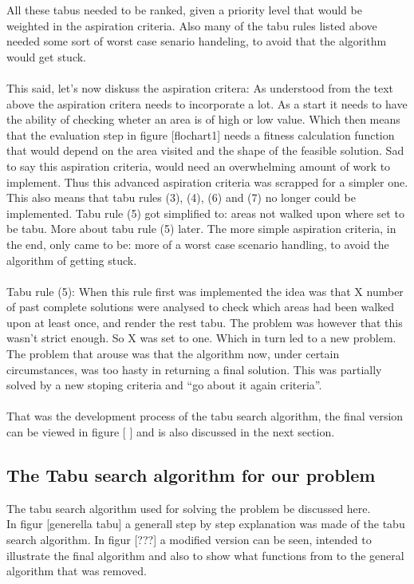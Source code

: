All these tabus needed to be ranked, given a priority level that would be weighted in the aspiration criteria. Also many of the tabu rules listed above needed some sort of worst case senario handeling, to avoid that the algorithm would get stuck.\\
\\This said, let's now diskuss the aspiration critera:
As understood from the text above the aspiration critera needs to incorporate a lot. As a start it needs to have the ability of checking wheter an area is of high or low value. Which then means that the evaluation step in figure [flochart1] needs a fitness calculation function that would depend on the area visited and the shape of the feasible solution. Sad to say this aspiration criteria, would need an overwhelming amount of work to implement. Thus this advanced aspiration criteria was scrapped for a simpler one. This also means that tabu rules (3), (4), (6) and (7) no longer could be implemented. Tabu rule (5) got simplified to:  areas not walked upon where set to be tabu. More about tabu rule (5) later. The more simple aspiration criteria, in the end, only came to be: more of a worst case scenario handling, to avoid the algorithm of getting stuck.\\
\\Tabu rule (5): When this rule first was implemented the idea was that X number of past complete solutions were analysed to check which areas had been walked upon at least once, and render the rest tabu. The problem was however that this wasn't strict enough. So X was set to one. Which in turn led to a new problem. The problem that arouse was that the algorithm now, under certain circumstances, was too hasty in returning a final solution. This was partially solved by a new stoping criteria and ``go about it again criteria''.\\
\\
That was the development process of the tabu search algorithm, the final version can be viewed in figure [ ] and is also discussed in the next section.\\
\subsection{The Tabu search algorithm for our problem}
The tabu search algorithm used for solving the problem be discussed here.\\
In figur [generella tabu] a generall step by step explanation was made of the tabu search algorithm. In figur [???] a modified version can be seen, intended to illustrate the final algorithm and also to show what functions from to the general algorithm that was removed.\\

